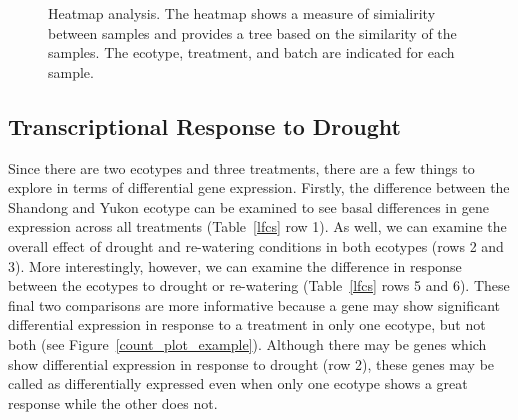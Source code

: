 \documentclass[12pt]{article}
\begin{document}
		\begin{figure}[H]
			\centering
			\scalebox{0.7}{}
			\caption[Heatmap analysis]{Heatmap analysis. The heatmap shows a measure of simialirity between samples and provides a tree based on the similarity of the samples. The ecotype, treatment, and batch are indicated for each sample.}
			\label{heatmap}
		\end{figure}
	\subsection{Transcriptional Response to Drought}
	Since there are two ecotypes and three treatments, there are a few things to explore in terms of differential gene expression. Firstly, the difference between the Shandong and Yukon ecotype can be examined to see basal differences in gene expression across all treatments (Table~\ref{lfcs} row 1). As well, we can examine the overall effect of drought and re-watering conditions in both ecotypes (rows 2 and 3). More interestingly, however, we can examine the difference in response between the ecotypes to drought or re-watering (Table~\ref{lfcs} rows 5 and 6). These final two comparisons are more informative because a gene may show significant differential expression in response to a treatment in only one ecotype, but not both (see Figure~\ref{count_plot_example}). 
	Although there may be genes which show differential expression in response to drought (row 2), these genes may be called as differentially expressed even when only one ecotype shows a great response while the other does not. 
\end{document}
